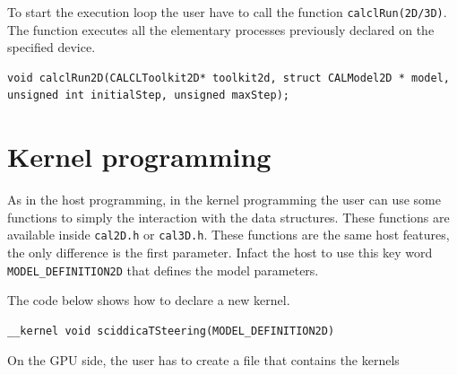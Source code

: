 To start the execution loop the user have to call the function \verb'calclRun(2D/3D)'. The function executes
all the elementary processes previously declared on the specified device.

\begin{lstlisting}
void calclRun2D(CALCLToolkit2D* toolkit2d, struct CALModel2D * model, unsigned int initialStep,	unsigned maxStep);
\end{lstlisting}


\section{Kernel programming} 

As in the host programming, in the kernel programming the user can use some functions
to simply the interaction with the data structures. These functions are available inside \verb'cal2D.h' or \verb'cal3D.h'.
These functions are the same host features, the only difference is the first parameter. Infact the host to use this key word 
\verb'MODEL_DEFINITION2D' that defines the model parameters.


The code below shows how to declare a new kernel.

\begin{lstlisting}
__kernel void sciddicaTSteering(MODEL_DEFINITION2D)
\end{lstlisting}


On the GPU side, the user has to create a file that contains the kernels  



